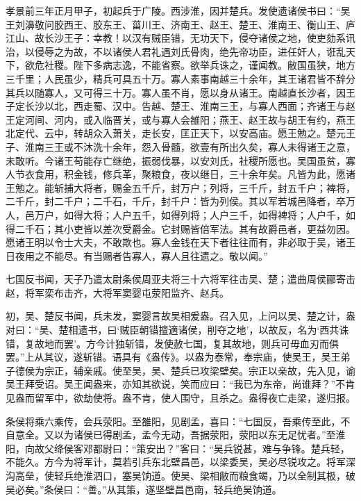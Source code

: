 \documentclass[12pt,UTF8]{ctexbook}
\begin{document}
孝景前三年正月甲子，初起兵于广陵。西涉淮，因并楚兵。发使遗诸侯书曰：“吴王刘濞敬问胶西王、胶东王、菑川王、济南王、赵王、楚王、淮南王、衡山王、庐江山、故长沙王子：幸教！以汉有贼臣错，无功天下，侵夺诸侯之地，使吏劾系讯治，以侵辱之为故，不以诸侯人君礼遇刘氏骨肉，绝先帝功臣，进任奸人，诳乱天下，欲危社稷。陛下多病志逸，不能省察。欲举兵诛之，谨闻教。敝国虽狭，地方三千里；人民虽少，精兵可具五十万。寡人素事南越三十余年，其王诸君皆不辞分其兵以随寡人，又可得三十万。寡人虽不肖，愿以身从诸王。南越直长沙者，因王子定长沙以北，西走蜀、汉中。告越、楚王、淮南三王，与寡人西面；齐诸王与赵王定河间、河内，或入临晋关，或与寡人会雒阳；燕王、赵王故与胡王有约，燕王北定代、云中，转胡众入萧关，走长安，匡正天下，以安高庙。愿王勉之。楚元王子、淮南三王或不沐洗十余年，怨入骨髓，欲壹有所出久矣，寡人未得诸王之意，未敢听。今诸王苟能存亡继绝，振弱伐暴，以安刘氏，社稷所愿也。吴国虽贫，寡人节衣食用，积金钱，修兵革，聚粮食，夜以继日，三十余年矣。凡皆为此，愿诸王勉之。能斩捕大将者，赐金五千斤，封万户；列将，三千斤，封五千户；裨将，二千斤，封二千户；二千石，千斤，封千户：皆为列侯。其以军若城邑降者，卒万人，邑万户，如得大将；人户五千，如得列将；人户三千，如得裨将；人户千，如得二千石；其小吏皆以差次受爵金。它封赐皆倍军法。其有故爵邑者，更益勿因。愿诸王明以令士大夫，不敢欺也。寡人金钱在天下者往往而有，非必取于吴，诸王日夜用之不能尽。有当赐者告寡人，寡人且往遗之。敬以闻。”



七国反书闻，天子乃遣太尉条侯周亚夫将三十六将军往击吴、楚；遣曲周侯郦寄击赵，将军栾布击齐，大将军窦婴屯荥阳监齐、赵兵。



初，吴、楚反书闻，兵未发，窦婴言故吴相爰盎。召入见，上问以吴、楚之计，盎对曰：“吴、楚相遗书，曰‘贼臣朝错擅適诸侯，削夺之地’，以故反，名为‘西共诛错，复故地而罢’。方今计独斩错，发使赦七国，复其故地，则兵可毋血刃而俱罢。”上从其议，遂斩错。语具有《盎传》。以盎为泰常，奉宗庙，使吴王，吴王弟子德侯为宗正，辅亲戚。使至吴，吴、楚兵已攻梁壁矣。宗正以亲故，先入见，谕吴王拜受诏。吴王闻盎来，亦知其欲说，笑而应曰：“我已为东帝，尚谁拜？”不肯见盎而留军中，欲劫使将。盎不肯，使人围守，且杀之。盎得夜亡走梁，遂归报。



条侯将乘六乘传，会兵荥阳。至雒阳，见剧孟，喜曰：“七国反，吾乘传至此，不自意全。又以为诸侯已得剧孟，孟今无动，吾据荥阳，荥阳以东无足忧者。”至淮阳，向故父绛侯客邓都尉曰：“策安出？”客曰：“吴兵锐甚，难与争锋。楚兵轻，不能久。方今为将军计，莫若引兵东北壁昌邑，以梁委吴，吴必尽锐攻之。将军深沟高垒，使轻兵绝淮泗口，塞吴饷道。使吴、梁相敝而粮食竭，乃以全制其极，破吴必矣。”条侯曰：“善。”从其策，遂坚壁昌邑南，轻兵绝吴饷道。
\end{document}
